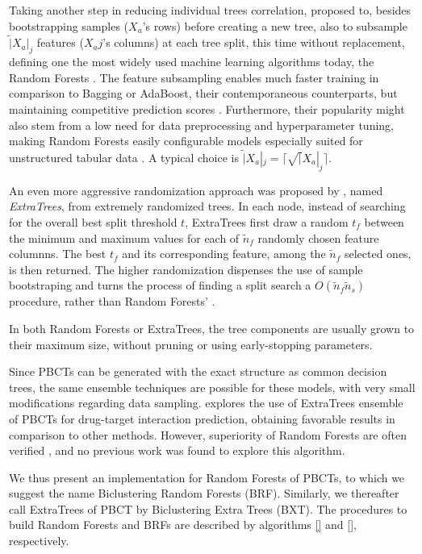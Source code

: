 \documentclass[conference]{IEEEtran}
\begin{document}
Taking another step in reducing individual trees correlation, \cite{Breiman_2001} proposed to, besides bootstrapping samples ($X_a$'s rows) before creating a new tree, also to subsample $\tilde |X_a|_j$ features ($X_aj$'s columns) at each tree split, this time without replacement, defining one the most widely used machine learning algorithms today, the Random Forests \cite{}. The feature subsampling enables much faster training in comparison to Bagging or AdaBoost, their contemporaneous counterparts, but maintaining competitive prediction scores \cite{Dietterich_2000}. Furthermore, their popularity might also stem from a low need for data preprocessing and hyperparameter tuning, making Random Forests easily configurable models especially suited for unstructured tabular data \cite{}. {} A typical choice is $\tilde |X_a|_j = \lceil \sqrt |X_a|_j \rceil$.

An even more aggressive randomization approach was proposed by \cite{Geurts_2006}, named \emph{ExtraTrees}, from extremely randomized trees. In each node, instead of searching for the overall best split threshold $t$, ExtraTrees first draw a random $t_f$ between the minimum and maximum values for each of $\tilde n_f$ randomly chosen feature columnns. The best $t_f$ and its corresponding feature, among the $\tilde n_f$ selected ones, is then returned. The higher randomization dispenses the use of sample bootstraping and turns the process of finding a split search a $O(\tilde n_f \tilde n_s)$ {{}} procedure, rather than Random Forests' {}.

In both Random Forests or ExtraTrees, the tree components are usually grown to their maximum size, without pruning or using early-stopping parameters.

Since PBCTs can be generated with the exact structure as common decision trees, the same ensemble techniques are possible for these models, with very small modifications regarding data sampling. \cite{Pliakos_2020} explores the use of ExtraTrees ensemble of PBCTs for drug-target interaction prediction, obtaining favorable results in comparison to other methods. However, superiority of Random Forests are often verified \cite{}, and no previous work was found to explore this algorithm.

We thus present an implementation for Random Forests of PBCTs, to which we suggest the name Biclustering Random Forests (BRF). Similarly, we thereafter call ExtraTrees of PBCT by Biclustering Extra Trees (BXT). The procedures to build Random Forests and BRFs are described by algorithms \ref{} and \ref{}, respectively.
\end{document}
